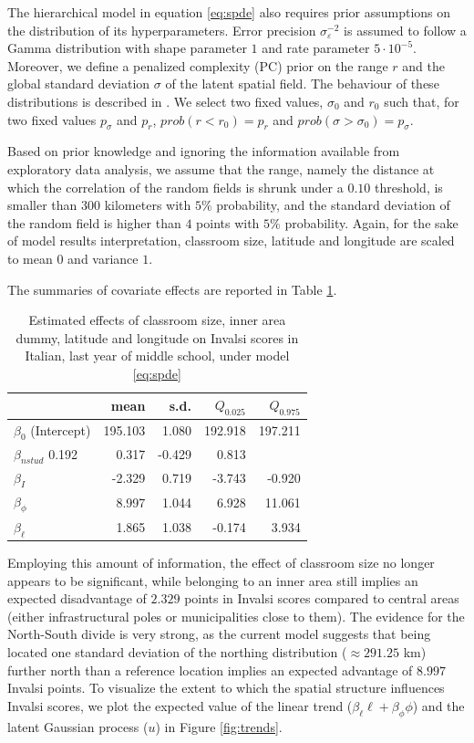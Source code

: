\documentclass{book}
\begin{document}
The hierarchical model in equation \ref{eq:spde} also requires prior assumptions on the distribution of its hyperparameters. Error precision $\sigma_{\varepsilon}^{-2}$ is assumed to follow a Gamma distribution with shape parameter $1$ and rate parameter $ 5 \cdot 10^{-5}$. Moreover, we define a penalized complexity (PC) prior \citep{PC} on the range $r$ and the global standard deviation $\sigma$ of the latent spatial field. The behaviour of these distributions is described in \cite{SPDEPC}. We select two fixed values, $\sigma_0$ and $r_0$ such that, for two fixed values $p_\sigma$ and $p_r$, $prob \left( r < r_0 \right) = p_r $ and $prob \left( \sigma > \sigma_0 \right) = p_\sigma$. 

Based on prior knowledge and ignoring the information available from exploratory data analysis, we assume that the range, namely the distance at which the correlation of the random fields is shrunk under a $0.10$ threshold, is smaller than $300$ kilometers with $5\%$ probability, and the standard deviation of the random field is higher than $4$ points with $5\%$ probability. Again, for the sake of model results interpretation, classroom size, latitude and longitude are scaled to mean $0$ and variance $1$. 

The summaries of covariate effects are reported in Table \ref{tab:betaSP}.
%
 \begin{table}
 \centering
\begin{tabular}{lrrrr}
 & mean & s.d. & $Q_{0.025}$ & $Q_{0.975}$ \\
 \hline
 $\beta_0$ (Intercept) & 195.103 & 1.080 & 192.918 & 197.211 \\  
 $\beta_{nstud}$ 0.192 & 0.317 & -0.429 & 0.813 \\ 
 $\beta_I$ & -2.329 & 0.719 & -3.743 & -0.920 \\ 
 $\beta_{\phi}$ & 8.997 & 1.044 & 6.928 & 11.061 \\ 
 $\beta_{\ell}$ &  1.865 & 1.038 & -0.174 & 3.934 \\ 
 \hline
\end{tabular}
\caption{Estimated effects of classroom size, inner area dummy, latitude and longitude on Invalsi scores in Italian, last year of middle school, under model \ref{eq:spde}}
\label{tab:betaSP}
\end{table}
%
Employing this amount of information, the effect of classroom size no longer appears to be significant, while belonging to an inner area still implies an expected disadvantage of $2.329 $ points in Invalsi scores compared to central areas (either infrastructural poles or municipalities close to them). The evidence for the North-South divide is very strong, as the current model suggests that being located one standard deviation of the northing distribution ($\approx 291.25$ km) further north than a reference location implies an expected advantage of $8.997$ Invalsi points. To visualize the extent to which the spatial structure influences Invalsi scores, we plot the expected value of the linear trend ($\beta_\ell \ell + \beta_\phi \phi$) and the latent Gaussian process ($u$) in Figure \ref{fig:trends}.
\end{document}
